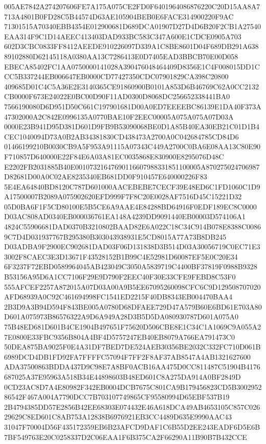 \documentclass[UTF8,fontset=fandol,zihao=-4,a4paper]{ctexart}
\begin{document}
{{005AE7842A274207606FE7A175A075CE2FD0F6401964086876220C20D15AA8A7713A4801B0FD28C5B44574D63AE105904BEB0E6FACE314900220F9AC
71301515A70340EBB4354E012900681D689DCA01907D27D4D6B20F2CB1A27540EAA314F9C1D14AEEC413403DAD933BC583C347A600E1CDCE0905A703
602D3CBC0833FF8412AEEDE910226097D339A1C8BE8601D04F689DB291A63889102880D62145118A0380AA13C7286413E0D7405EAD3BBCB70E00D058
EBECA85402FC1AA0750000141028A390476048464409D8356E1C4F008015DD1CCC5B337244EB006647EB0000CD77427350CDC07901829CA398C20800
409685D01C4C5A36E2E3140365CE91860900B0101A853D6B46769C62A0CC2132CB0000F673E24022E0BC00D90F11AD0300D8068DC256652338441BA0
7566190080D6D951D50C661C197901681D00A0ED7EEEEBC86139E1DA40F373A47302000A2C842E0996135A0770BAE10F2EEC00005A075A075A07D03A
0000E23B941D95D381D601D9FB9B53090068BE0D1A85B40EA30EB21C01D1B4CEC1040094D73A0B2AB34381830CD438473A2700A0C042684785CD84D6
01466199210B0030CB9A5F953A91115A07343C449A2700C0BA6E08AA13C80E90F710857D640000E22F84E6A03A81EC0035868E830900E8295076D48C
E2202FB2031885B40E00107321647690116607988331851100005A870275024706987D82681D00A0C02AE8235340EB681DD0F910457E640000226F83
5E4EA64840BD8120C787D601000AACEBEBE7CECF39E48ED6C1FD1060C1D9A17500007B2089A075902620EFD999F7F8C20E0028AF7516D45C15221D32
05D0BA6F1F5CD80100E5B5CE6A9AAE4E84288BD64916F0EDF189EC8C0000D03AC808AD0340EB000036761EA148A4239DD9091440EB00003D574106A1
4824C55906681DAD0370B3210802BAAD82E6A022C18C34C914B078E8388C00869C7D4D031937767B295380B303043938931E5CD8015A77A73B8DB245
D03ADBA9F2900EC902681DAD03F06D131838D3B514D03A30056719C0EC71E33002F8CAEC3E3D13671F43528152B1B99C4E52981D60087EF5E0C20E34
6F3237F72EBD0589964045AB423049C3050A5839719C4400BF37819F0988B9328B53156A95D6A1CC7106F29E9D790F2EEC40F30E33CFE9FEBD8C53F0
555AFCEF2257A872015A07D03A00A9B5EE67095260098CFC6C9D129508707020AFD68939A0C92C461694998FC1541ED2215F40DB8343EB004470BAA4
2B3D9A3B94D594F843BE005A0780D68DFAEE729D47A579B60E6BD61E703A80D601A075973B86576322A9D6A949A28D3B5D5DA080930787D601A075A0
75B48ED681D601B4CE1904B497651F75620D506CBE8E1C34C1A1069C9A055A27E0800E33FBC9356B804A4BF4D5757247EB40EB8079A766EA791473C0
50DEA875BA9025F0E4A31DF7BED7DE524AEB30356BE2032C332FC710D061B6989DCD4DB1FD92FA7FFFFC57094F7FF2F8AF37AB8547A4AB1321627600
ADA37500863BDDA437D9C98E7A8BF0ACB16AA475D0CC811487C51904B4176687025A37E95963A518B34E44898603B48ED601C8A275DA914A0BF2849D
0CD23AC8D7A4E80982F342EB0004DCB7675C801CA9B179456823CD5B300295286542F467A004A7790DCC7B703107749865CF95580994D65EBF537B19
2B4794385DD57E2856B42EE68303E074432E46A618DCA49AB4653105C857C02629629C8ED601C8AB753A12838B6976921EB3CC4489D635E9990AAC43
31047F70004D56F435172359EB6B23AFCD9DAF1C6B55D2EE243EADF6D5E6B7BF549763E20C0258337D2C06EAA1F6B375CA2F66290A11B90B7B432CCE
}}
\end{document}
